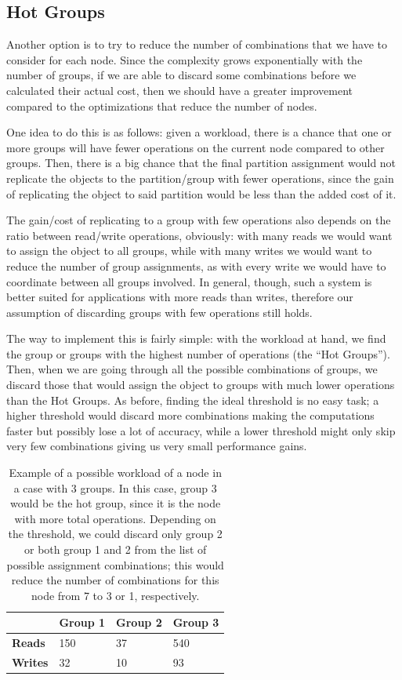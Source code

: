 \subsection{Hot Groups}\label{sec:hot-groups}
Another option is to try to reduce the number of combinations that we have to consider for each node. Since the complexity grows exponentially with the number of groups, if we are able to discard some combinations before we calculated their actual cost, then we should have a greater improvement compared to the optimizations that reduce the number of nodes.

One idea to do this is as follows: given a workload, there is a chance that one or more groups will have fewer operations on the current node compared to other groups. Then, there is a big chance that the final partition assignment would not replicate the objects to the partition/group with fewer operations, since the gain of replicating the object to said partition would be less than the added cost of it.

The gain/cost of replicating to a group with few operations also depends on the ratio between read/write operations, obviously: with many reads we would want to assign the object to all groups, while with many writes we would want to reduce the number of group assignments, as with every write we would have to coordinate between all groups involved. In general, though, such a system is better suited for applications with more reads than writes, therefore our assumption of discarding groups with few operations still holds.

The way to implement this is fairly simple: with the workload at hand, we find the group or groups with the highest number of operations (the ``Hot Groups''). Then, when we are going through all the possible combinations of groups, we discard those that would assign the object to groups with much lower operations than the Hot Groups. As before, finding the ideal threshold is no easy task; a higher threshold would discard more combinations making the computations faster but possibly lose a lot of accuracy, while a lower threshold might only skip very few combinations giving us very small performance gains. 


\begin{table}[!htb]
  \centering
  \begin{tabular}{l l l l}
    \hline
    & \textbf{Group 1} & \textbf{Group 2} & \textbf{Group 3} \\
    \hline
    \textbf{Reads} & 150 & 37 & 540 \\
    \textbf{Writes} & 32 & 10 & 93 \\
    \hline
  \end{tabular}
  \caption{Example of a possible workload of a node in a case with 3 groups. In this case, group 3 would be the hot group, since it is the node with more total operations. Depending on the threshold, we could discard only group 2 or both group 1 and 2 from the list of possible assignment combinations; this would reduce the number of combinations for this node from 7 to 3 or 1, respectively.}\label{tab:workload-example}
\end{table}

